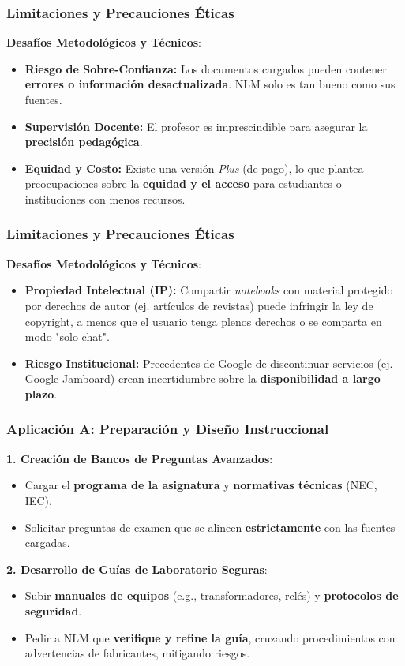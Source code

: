 \documentclass[aspectratio=43]{beamer}
\begin{document}
\begin{frame}
\frametitle{Limitaciones y Precauciones Éticas}

\textbf{Desafíos Metodológicos y Técnicos}:
  \begin{itemize}
      \item \textbf{Riesgo de Sobre-Confianza:} Los documentos cargados pueden contener \textbf{errores o información desactualizada}. NLM solo es tan bueno como sus fuentes.
      \item \textbf{Supervisión Docente:} El profesor es imprescindible para asegurar la \textbf{precisión pedagógica}.
      \item \textbf{Equidad y Costo:} Existe una versión \textit{Plus} (de pago), lo que plantea preocupaciones sobre la \textbf{equidad y el acceso} para estudiantes o instituciones con menos recursos.
  \end{itemize}
\end{frame}

\begin{frame}
  \frametitle{Limitaciones y Precauciones Éticas}
  \textbf{Desafíos Metodológicos y Técnicos}:
  \begin{itemize}
      \item \textbf{Propiedad Intelectual (IP):} Compartir \textit{notebooks} con material protegido por derechos de autor (ej. artículos de revistas) puede infringir la ley de copyright, a menos que el usuario tenga plenos derechos o se comparta en modo "solo chat".
      \item \textbf{Riesgo Institucional:} Precedentes de Google de discontinuar servicios (ej. Google Jamboard) crean incertidumbre sobre la \textbf{disponibilidad a largo plazo}.
  \end{itemize}
\end{frame}



\begin{frame}
\frametitle{Aplicación A: Preparación y Diseño Instruccional}

\textbf{1. Creación de Bancos de Preguntas Avanzados}:
\begin{itemize}
    \item Cargar el \textbf{programa de la asignatura} y \textbf{normativas técnicas} (NEC, IEC).
    \item Solicitar preguntas de examen que se alineen \textbf{estrictamente} con las fuentes cargadas.
\end{itemize}

\textbf{2. Desarrollo de Guías de Laboratorio Seguras}:
\begin{itemize}
    \item Subir \textbf{manuales de equipos} (e.g., transformadores, relés) y \textbf{protocolos de seguridad}.
    \item Pedir a NLM que \textbf{verifique y refine la guía}, cruzando procedimientos con advertencias de fabricantes, mitigando riesgos.
\end{itemize}
\end{frame}
\end{document}
